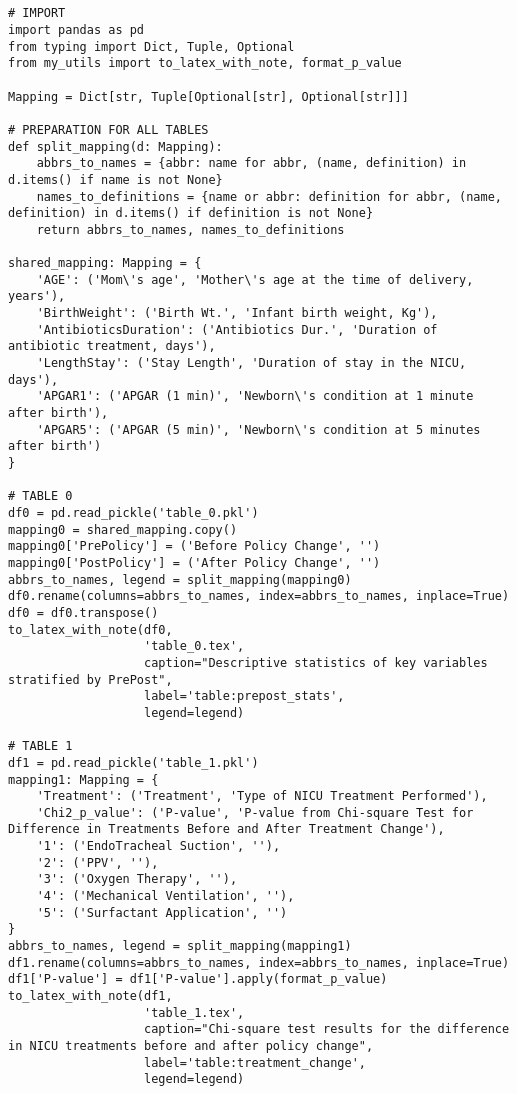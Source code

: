 \documentclass[11pt]{article}
\begin{document}
\begin{verbatim}


# IMPORT
import pandas as pd
from typing import Dict, Tuple, Optional
from my_utils import to_latex_with_note, format_p_value

Mapping = Dict[str, Tuple[Optional[str], Optional[str]]]

# PREPARATION FOR ALL TABLES
def split_mapping(d: Mapping):
    abbrs_to_names = {abbr: name for abbr, (name, definition) in d.items() if name is not None}
    names_to_definitions = {name or abbr: definition for abbr, (name, definition) in d.items() if definition is not None}
    return abbrs_to_names, names_to_definitions

shared_mapping: Mapping = {
    'AGE': ('Mom\'s age', 'Mother\'s age at the time of delivery, years'),
    'BirthWeight': ('Birth Wt.', 'Infant birth weight, Kg'),
    'AntibioticsDuration': ('Antibiotics Dur.', 'Duration of antibiotic treatment, days'),
    'LengthStay': ('Stay Length', 'Duration of stay in the NICU, days'),
    'APGAR1': ('APGAR (1 min)', 'Newborn\'s condition at 1 minute after birth'),
    'APGAR5': ('APGAR (5 min)', 'Newborn\'s condition at 5 minutes after birth')
}

# TABLE 0
df0 = pd.read_pickle('table_0.pkl')
mapping0 = shared_mapping.copy()
mapping0['PrePolicy'] = ('Before Policy Change', '')
mapping0['PostPolicy'] = ('After Policy Change', '')
abbrs_to_names, legend = split_mapping(mapping0)
df0.rename(columns=abbrs_to_names, index=abbrs_to_names, inplace=True)
df0 = df0.transpose()
to_latex_with_note(df0, 
                   'table_0.tex', 
                   caption="Descriptive statistics of key variables stratified by PrePost", 
                   label='table:prepost_stats',
                   legend=legend)

# TABLE 1
df1 = pd.read_pickle('table_1.pkl')
mapping1: Mapping = {
    'Treatment': ('Treatment', 'Type of NICU Treatment Performed'),
    'Chi2_p_value': ('P-value', 'P-value from Chi-square Test for Difference in Treatments Before and After Treatment Change'),
    '1': ('EndoTracheal Suction', ''),
    '2': ('PPV', ''),
    '3': ('Oxygen Therapy', ''),
    '4': ('Mechanical Ventilation', ''),
    '5': ('Surfactant Application', '')
} 
abbrs_to_names, legend = split_mapping(mapping1)
df1.rename(columns=abbrs_to_names, index=abbrs_to_names, inplace=True)
df1['P-value'] = df1['P-value'].apply(format_p_value)
to_latex_with_note(df1, 
                   'table_1.tex',
                   caption="Chi-square test results for the difference in NICU treatments before and after policy change",
                   label='table:treatment_change',
                   legend=legend)


\end{verbatim}
\end{document}
